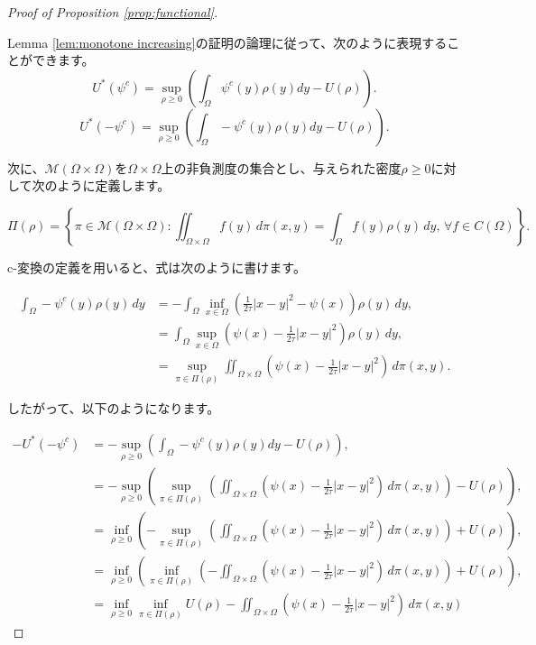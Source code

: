 \documentclass{jsarticle}
\theoremstyle{definition}
\begin{document}
\begin{proof}[Proof of Proposition \ref{prop:functional}]
    \hypertarget{proof:prop:functional}{}
    \quad\par
    Lemma \ref{lem:monotone increasing}の証明の論理に従って、次のように表現することができます。
    $$
        U^*(\psi^c) = \sup_{\rho \geq 0} \left( \int_\Omega \psi^c(y) \rho(y) dy - U(\rho) \right).
    $$
    $$
        U^*(- \psi^c) = \sup_{\rho \geq 0} \left( \int_\Omega - \psi^c(y) \rho(y) dy - U(\rho) \right).
    $$

    次に、$\mathcal{M}(\Omega \times \Omega)$を$\Omega \times \Omega$上の非負測度の集合とし、与えられた密度$\rho \geq 0$に対して次のように定義します。

    \[
        \Pi(\rho) = \left\{ \pi \in \mathcal{M}(\Omega \times \Omega) : \iint_{\Omega \times \Omega} f(y) \, d\pi(x, y) = \int_\Omega f(y) \rho(y) \, dy,  \, \forall f \in C(\Omega) \right\}.
    \]

    c-変換の定義を用いると、式は次のように書けます。

    \begin{align*}
        \int_\Omega - \psi^c(y) \rho(y) \, dy   &= - \int_\Omega \inf_{x \in \Omega} \left( \frac{1}{2\tau}|x-y|^2 - \psi(x)\right) \rho(y) \, dy,\\
                                                &= \int_\Omega  \sup_{x \in \Omega} \left( \psi(x) - \frac{1}{2\tau}|x-y|^2 \right) \rho(y) \, dy,\\
                                                &= \sup_{\pi \in \Pi(\rho)} \iint_{\Omega \times \Omega}\left(\psi(x) - \frac{1}{2 \tau}|x-y|^2 \right)\, d\pi(x, y).
    \end{align*}

    したがって、以下のようになります。

    \begin{align*}
        - U^*(- \psi^c) &= - \sup_{\rho \geq 0} \left( \int_\Omega - \psi^c(y) \rho(y) dy - U(\rho) \right),\\
                        &= - \sup_{\rho \geq 0} \left( \sup_{\pi \in \Pi(\rho)} \left(\iint_{\Omega \times \Omega}  \left(\psi(x) - \frac{1}{2 \tau}|x-y|^2 \right) \, d\pi(x, y) \right)- U(\rho) \right),\\
                        &= \inf_{\rho \geq 0} \left( - \sup_{\pi \in \Pi(\rho)} \left(\iint_{\Omega \times \Omega} \left(\psi(x) - \frac{1}{2 \tau}|x-y|^2 \right) \, d\pi(x, y) \right) + U(\rho) \right),\\
                        &= \inf_{\rho \geq 0} \left( \inf_{\pi \in \Pi(\rho)} \left( - \iint_{\Omega \times \Omega}  \left(\psi(x) - \frac{1}{2 \tau}|x-y|^2 \right) \, d\pi(x, y) \right) + U(\rho) \right),\\
                        &= \inf_{\rho \geq 0} \inf_{\pi \in \Pi(\rho)} U(\rho) -  \iint_{\Omega \times \Omega} \left( \psi(x) - \frac{1}{2 \tau} |x - y|^2\right) \, d\pi(x, y)
    \end{align*}


\end{proof}
\end{document}

